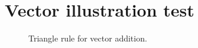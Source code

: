 \documentclass[11pt]{article}
\begin{document}
\section*{Vector illustration test}
\begin{figure}[H]
\centering

\caption{Triangle rule for vector addition.}
\end{figure}
\end{document}

